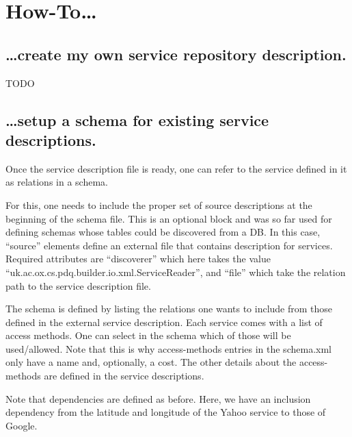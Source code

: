 \section{How-To\dots}

\subsection{\dots create my own service repository description.}
TODO

\subsection{\dots setup a schema for existing service descriptions.}
Once the service description file is ready, one can refer to the
service defined in it as relations in a schema.

For this, one needs to include the proper set of source descriptions
at the beginning of the schema file.
This is an optional block and was so far used for defining schemas
whose tables could be discovered from a DB.
In this case, ``source'' elements define an external file that contains
description for services. 
Required attributes are ``discoverer'' which here takes the value
``uk.ac.ox.cs.pdq.builder.io.xml.ServiceReader'', and ``file'' which
take the relation path to the service description file.

The schema is defined by listing the relations one wants to include
from those defined in the external service description.
Each service comes with a list of access methods.
One can select in the schema which of those will be used/allowed.
Note that this is why access-methods entries in the schema.xml only
have a name and, optionally, a cost.
The other details about the access-methods are defined in the service
descriptions.

Note that dependencies are defined as before. Here, we have an
inclusion dependency from the latitude and longitude of the Yahoo
service to those of Google.

